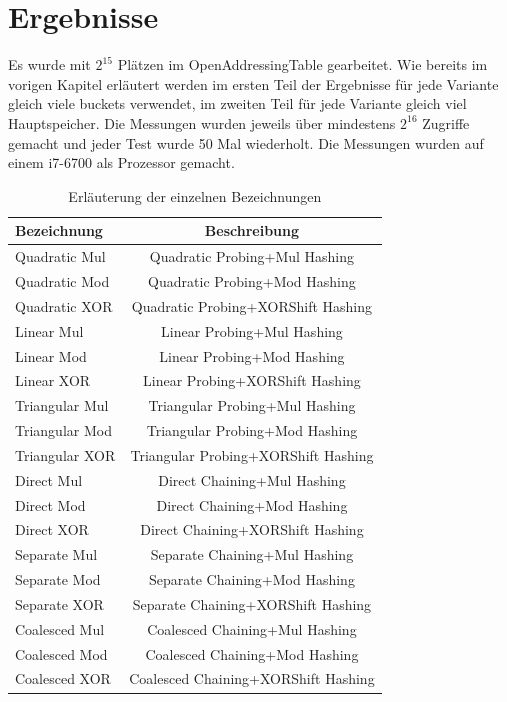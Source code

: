 \chapter{Ergebnisse}
Es wurde mit $2^15$ Plätzen im OpenAddressingTable gearbeitet. Wie bereits im vorigen Kapitel erläutert werden im ersten Teil der Ergebnisse für jede Variante gleich viele buckets verwendet, im zweiten Teil für jede Variante gleich viel Hauptspeicher. Die Messungen wurden jeweils über mindestens $2^16$ Zugriffe gemacht und jeder Test wurde 50 Mal wiederholt. Die Messungen wurden auf einem i7-6700 als Prozessor gemacht.

\begin{table}[!ht]
\begin{tabular}{l|c}
    Bezeichnung & Beschreibung \\
    \hline
    Quadratic Mul & Quadratic Probing+Mul Hashing\\
    Quadratic Mod & Quadratic Probing+Mod Hashing\\
    Quadratic XOR & Quadratic Probing+XORShift Hashing\\
    \hline
    Linear Mul & Linear Probing+Mul Hashing\\
    Linear Mod & Linear Probing+Mod Hashing\\
    Linear XOR & Linear Probing+XORShift Hashing\\
    \hline
    Triangular Mul & Triangular Probing+Mul Hashing\\
    Triangular Mod & Triangular Probing+Mod Hashing\\
    Triangular XOR & Triangular Probing+XORShift Hashing\\
    \hline
    Direct Mul & Direct Chaining+Mul Hashing\\
    Direct Mod & Direct Chaining+Mod Hashing\\
    Direct XOR & Direct Chaining+XORShift Hashing\\
    \hline
    Separate Mul & Separate Chaining+Mul Hashing\\
    Separate Mod & Separate Chaining+Mod Hashing\\
    Separate XOR & Separate Chaining+XORShift Hashing\\
    \hline
    Coalesced Mul & Coalesced Chaining+Mul Hashing\\
    Coalesced Mod & Coalesced Chaining+Mod Hashing\\
    Coalesced XOR & Coalesced Chaining+XORShift Hashing\\
\end{tabular}
\centering
\caption{Erläuterung der einzelnen Bezeichnungen}
\end{table}
\FloatBarrier
